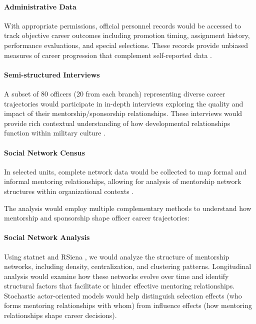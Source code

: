 \documentclass[main.tex]{subfiles}
\begin{document}
\paragraph{Administrative Data} With appropriate permissions, official personnel records would be accessed to track objective career outcomes including promotion timing, assignment history, performance evaluations, and special selections. These records provide unbiased measures of career progression that complement self-reported data \cite{misq2008career}.

\paragraph{Semi-structured Interviews} A subset of 80 officers (20 from each branch) representing diverse career trajectories would participate in in-depth interviews exploring the quality and impact of their mentorship/sponsorship relationships. These interviews would provide rich contextual understanding of how developmental relationships function within military culture \cite{alachkar2023sponsor}.

\paragraph{Social Network Census} In selected units, complete network data would be collected to map formal and informal mentoring relationships, allowing for analysis of mentorship network structures within organizational contexts \cite{cdc2015network}.


The analysis would employ multiple complementary methods to understand how mentorship and sponsorship shape officer career trajectories:

\paragraph{Social Network Analysis} Using statnet \cite{cran2023statnet} and RSiena \cite{cran2023rsiena}, we would analyze the structure of mentorship networks, including density, centralization, and clustering patterns. Longitudinal analysis would examine how these networks evolve over time and identify structural factors that facilitate or hinder effective mentoring relationships. Stochastic actor-oriented models would help distinguish selection effects (who forms mentoring relationships with whom) from influence effects (how mentoring relationships shape career decisions).
\end{document}
